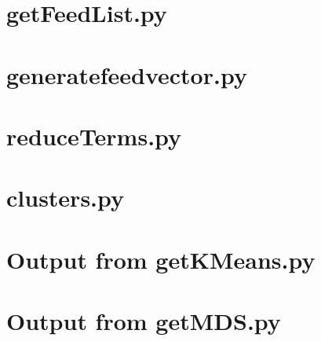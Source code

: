 \documentclass{article}
\begin{document}

\newpage
\appendix

\section{getFeedList.py}


\section{generatefeedvector.py}


\section{reduceTerms.py}


\section{clusters.py}


\section{Output from getKMeans.py}


\section{Output from getMDS.py}


\newpage



\end{document}
